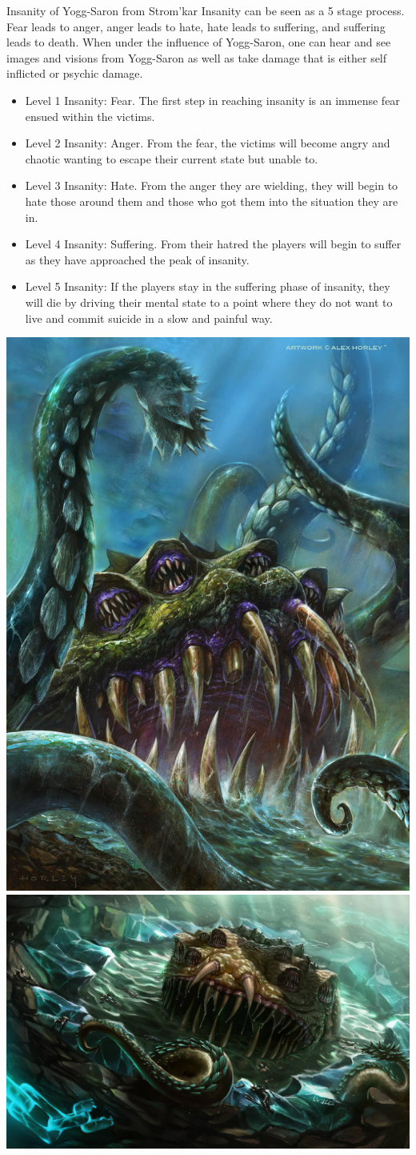 \begin{commentbox}{Insanity of Yogg-Saron from Strom'kar}
	Insanity can be seen as a 5 stage process. Fear leads to anger, anger leads to hate, hate leads to suffering, and suffering leads to death. When under the influence of Yogg-Saron, one can hear and see images and visions from Yogg-Saron as well as take damage that is either self inflicted or psychic damage.
	\begin{itemize}
		\item Level 1 Insanity: Fear. The first step in reaching insanity is an immense fear ensued within the victims. 
		\item Level 2 Insanity: Anger. From the fear, the victims will become angry and chaotic wanting to escape their current state but unable to.
		\item Level 3 Insanity: Hate. From the anger they are wielding, they will begin to hate those around them and those who got them into the situation they are in.
		\item Level 4 Insanity: Suffering. From their hatred the players will begin to suffer as they have approached the peak of insanity.
		\item Level 5 Insanity: If the players stay in the suffering phase of insanity, they will die by driving their mental state to a point where they do not want to live and commit suicide in a slow and painful way.
	\end{itemize}

\begin{center}
	\includegraphics[width=0.31\linewidth]{img/WoW/CallofYogg-Saron.jpg} 	\includegraphics[width=0.675\linewidth]{img/WoW/yoggsarond210alw-fullview.jpg}
\end{center}
\end{commentbox}

